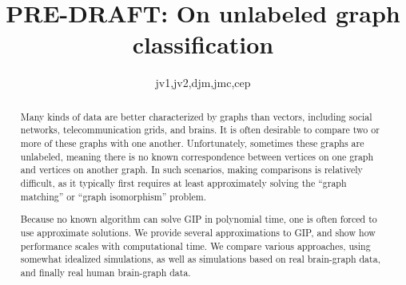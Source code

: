  
\usepackage{url}

\newcommand{\mcE}{\mathcal{E}}
\newcommand{\mcT}{\mathcal{T}}
\newcommand{\mcG}{\mathcal{G}}
\newcommand{\mcM}{\mathcal{M}}
\newcommand{\mcL}{\mathcal{L}}
\newcommand{\hatmcE}{\widehat{\mcE}}
\newcommand{\hatp}{\widehat{p}}
\newcommand{\hatP}{\widehat{P}}
\newcommand{\hatQ}{\widehat{Q}}
\newcommand{\hatL}{\widehat{L}}
\newcommand{\mhP}{\widehat{\PP}}
\newcommand{\tildeA}{\widetilde{A}}
\newcommand{\GG}{\mathbb{G}}

\newcommand{\defa}{\begin{defi}}
\newcommand{\defb}{\end{defi}}

\newtheorem{Rem}{Remark}%
\newtheorem{Alg}{Algorithm}%
\newtheorem{Thm}{Theorem}[section]
\newtheorem{Lem}{Lemma}[section]
\newtheorem{Def}{Definition}[section]

\title{PRE-DRAFT: On unlabeled graph classification}

\author{jv1,jv2,djm,jmc,cep}



\maketitle



\begin{abstract}
	
Many kinds of data are better characterized by graphs than vectors, including social networks, telecommunication grids, and brains.  It is often desirable to compare two or more of these graphs with one another.  Unfortunately, sometimes these graphs are unlabeled, meaning there is no known correspondence between vertices on one graph and vertices on another graph. In such scenarios, making comparisons is relatively difficult, as it typically first requires at least approximately solving the ``graph matching'' or ``graph isomorphism'' problem.  

Because no known algorithm can solve GIP in polynomial time, one is often forced to use approximate solutions.  We provide several approximations to GIP, and show how performance scales with computational time.  We compare various approaches, using somewhat idealized simulations, as well as simulations based on real brain-graph data, and finally real human brain-graph data.

\end{abstract}

